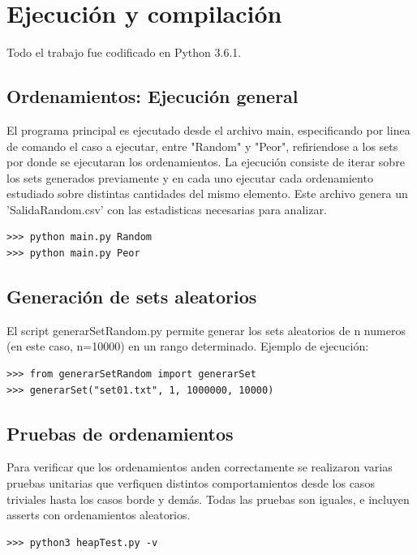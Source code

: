 \documentclass[article,a4paper]{article}
\begin{document}
\section{Ejecución y compilación}

Todo el trabajo fue codificado en Python 3.6.1. 

\subsection{Ordenamientos: Ejecución general}

El programa principal es ejecutado desde el archivo main, especificando por linea de comando el caso a ejecutar, entre "Random" y "Peor", refiriendose a los sets por donde se ejecutaran los ordenamientos. La ejecución consiste de iterar sobre los sets generados previamente y en cada uno ejecutar cada ordenamiento estudiado sobre distintas cantidades del mismo elemento. Este archivo genera un 'SalidaRandom.csv' con las estadisticas necesarias para analizar.

\begin{verbatim}
>>> python main.py Random
>>> python main.py Peor
\end{verbatim}

\subsection{Generación de sets aleatorios}

El script generarSetRandom.py permite generar los sets aleatorios de n numeros (en este caso, n=10000) en un rango determinado. Ejemplo de ejecución:

\begin{verbatim}
>>> from generarSetRandom import generarSet
>>> generarSet("set01.txt", 1, 1000000, 10000)
\end{verbatim}

\subsection{Pruebas de ordenamientos}
Para verificar que los ordenamientos anden correctamente se realizaron varias pruebas unitarias que verfiquen distintos comportamientos desde los casos triviales hasta los casos borde y demás. Todas las pruebas son iguales, e incluyen asserts con ordenamientos aleatorios.

\begin{verbatim}
>>> python3 heapTest.py -v
\end{verbatim}
\end{document}
